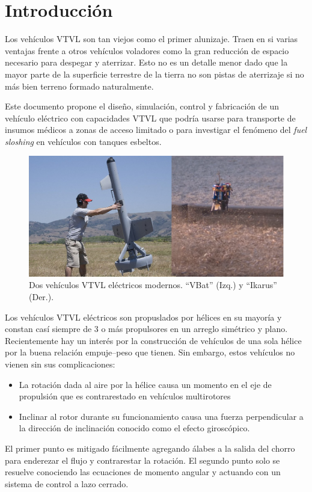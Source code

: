 \section{Introducción}

Los vehículos VTVL son tan viejos como el primer alunizaje. Traen en si varias ventajas frente a otros vehículos voladores como la gran reducción de espacio necesario para despegar y aterrizar. Esto no es un detalle menor dado que la mayor parte de la superficie terrestre de la tierra no son pistas de aterrizaje si no más bien terreno formado naturalmente.

Este documento propone el diseño, simulación, control y fabricación de un vehículo eléctrico con capacidades VTVL que podría usarse para transporte de insumos médicos a zonas de acceso limitado o para investigar el fenómeno del \textit{fuel sloshing} en vehículos con tanques esbeltos.

\begin{figure}[htb]
    \centering
    \includegraphics[width=0.8\linewidth]{fig/vbat_icarus.png}
    \caption{Dos vehículos VTVL eléctricos modernos. ``VBat'' (Izq.) y ``Ikarus'' (Der.).}
    \label{fig:vbat_icarus}
\end{figure}

Los vehículos VTVL eléctricos son propuslados por hélices en su mayoría y constan casí siempre de 3 o más propulsores en un arreglo simétrico y plano. Recientemente hay un interés por la construcción de vehículos de una sola hélice por la buena relación empuje--peso que tienen. Sin embargo, estos vehículos no vienen sin sus complicaciones: 

\begin{itemize}
    \item La rotación dada al aire por la hélice causa un momento en el eje de propulsión que es contrarestado en vehículos multirotores
    \item Inclinar al rotor durante su funcionamiento causa una fuerza perpendicular a la dirección de inclinación conocido como el efecto giroscópico. 
\end{itemize}

El primer punto es mitigado fácilmente agregando álabes a la salida del chorro para enderezar el flujo y contrarestar la rotación. El segundo punto solo se resuelve conociendo las ecuaciones de momento angular y actuando con un sistema de control a lazo cerrado.


